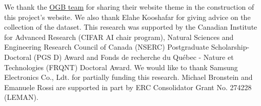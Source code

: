 \begin{ack}
We thank the \href{https://ogb.stanford.edu/}{OGB team} for sharing their website theme in the construction of this project's website. We also thank Elahe Kooshafar for giving advice on the collection of the \fm dataset. This research was supported by the Canadian Institute for Advanced Research (CIFAR AI chair
program), Natural Sciences and Engineering Research Council of Canada (NSERC) Postgraduate Scholarship-Doctoral (PGS D) Award and Fonds de recherche du Québec - Nature et Technologies (FRQNT) Doctoral Award.  
We would like to thank Samsung Electronics Co., Ldt. for partially funding this research.
Michael Bronstein and Emanuele Rossi are supported in part by ERC Consolidator Grant No. 274228 (LEMAN).

\end{ack}